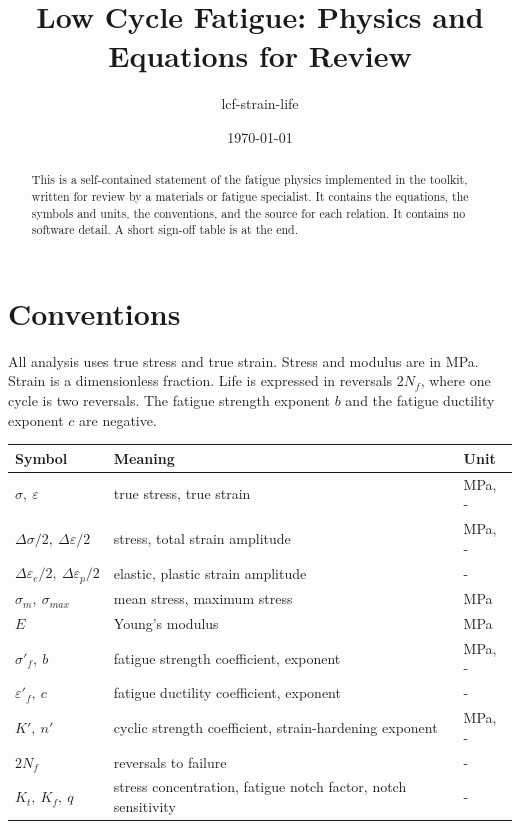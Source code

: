 \documentclass[11pt]{article}
\title{Low Cycle Fatigue: Physics and Equations for Review}
\author{lcf-strain-life}
\date{\today}
\begin{document}
\maketitle

\begin{abstract}
This is a self-contained statement of the fatigue physics implemented in the
toolkit, written for review by a materials or fatigue specialist. It contains the
equations, the symbols and units, the conventions, and the source for each
relation. It contains no software detail. A short sign-off table is at the end.
\end{abstract}

\section{Conventions}

All analysis uses true stress and true strain. Stress and modulus are in
\si{\mega\pascal}. Strain is a dimensionless fraction. Life is expressed in
reversals \(2N_f\), where one cycle is two reversals. The fatigue strength
exponent \(b\) and the fatigue ductility exponent \(c\) are negative.

\begin{table}[h]
\centering
\small
\begin{tabular}{lll}
\toprule
Symbol & Meaning & Unit \\
\midrule
\(\sigma,\ \varepsilon\) & true stress, true strain & \si{\mega\pascal}, - \\
\(\Delta\sigma/2,\ \Delta\varepsilon/2\) & stress, total strain amplitude & \si{\mega\pascal}, - \\
\(\Delta\varepsilon_e/2,\ \Delta\varepsilon_p/2\) & elastic, plastic strain amplitude & - \\
\(\sigma_m,\ \sigma_{max}\) & mean stress, maximum stress & \si{\mega\pascal} \\
\(E\) & Young's modulus & \si{\mega\pascal} \\
\(\sigma'_f,\ b\) & fatigue strength coefficient, exponent & \si{\mega\pascal}, - \\
\(\varepsilon'_f,\ c\) & fatigue ductility coefficient, exponent & - \\
\(K',\ n'\) & cyclic strength coefficient, strain-hardening exponent & \si{\mega\pascal}, - \\
\(2N_f\) & reversals to failure & - \\
\(K_t,\ K_f,\ q\) & stress concentration, fatigue notch factor, notch sensitivity & - \\
\bottomrule
\end{tabular}
\end{table}
\end{document}
